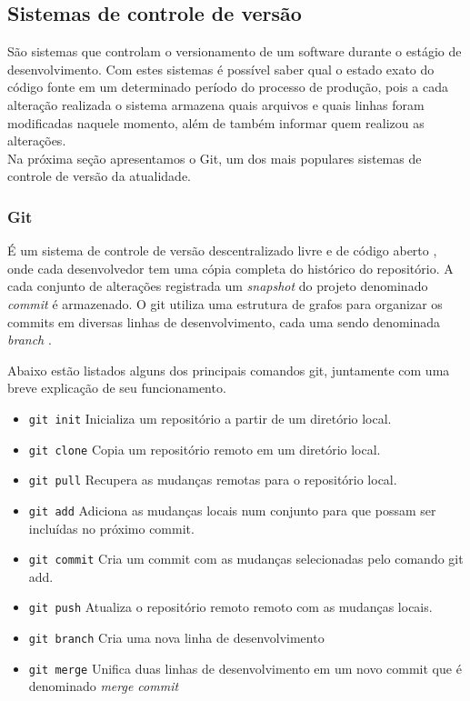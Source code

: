 \documentclass[a4paper,12pt]{article}
\begin{document}
\subsection{Sistemas de controle de versão}%
\label{sec:scv}
São sistemas que controlam o versionamento de um software durante o estágio de desenvolvimento. Com estes sistemas é possível saber qual o estado exato do código fonte em um determinado período do processo de produção, pois a cada alteração realizada o sistema armazena quais arquivos e quais linhas foram modificadas naquele momento, além de também informar quem realizou as alterações.\\

Na próxima seção apresentamos o Git, um dos mais populares sistemas de controle de versão da atualidade.

\subsubsection{Git}%
É um sistema de controle de versão descentralizado livre e de código aberto \cite{git}, onde cada desenvolvedor tem uma cópia completa do histórico do repositório. A cada conjunto de  alterações registrada  um \textit{snapshot} do projeto denominado \textit{commit} é armazenado. O git utiliza uma estrutura de grafos para organizar os commits em diversas linhas de desenvolvimento, cada uma sendo denominada \textit{branch} \cite{gitHandbook}.

Abaixo estão listados alguns dos principais comandos git, juntamente com uma breve explicação de seu funcionamento.

\begin{itemize}
\item{{\small\texttt{git init}} } Inicializa um repositório a partir de um diretório local.
\item{{\small\texttt{git clone}} } Copia um repositório remoto em um diretório local.
\item{{\small\texttt{git pull}} } Recupera as mudanças remotas para o repositório local.
\item{{\small\texttt{git add}} } Adiciona as mudanças locais num conjunto para que possam ser incluídas no próximo commit.
\item{{\small\texttt{git commit}} } Cria um commit com as mudanças selecionadas pelo comando git add.
\item{{\small\texttt{git push}} } Atualiza o repositório remoto remoto com as mudanças locais.
\item{{\small\texttt{git branch}} } Cria uma nova linha de desenvolvimento
\item{{\small\texttt{git merge}} } Unifica duas linhas de desenvolvimento em um novo commit que é denominado \textit{merge commit}
\end{itemize}
\end{document}
